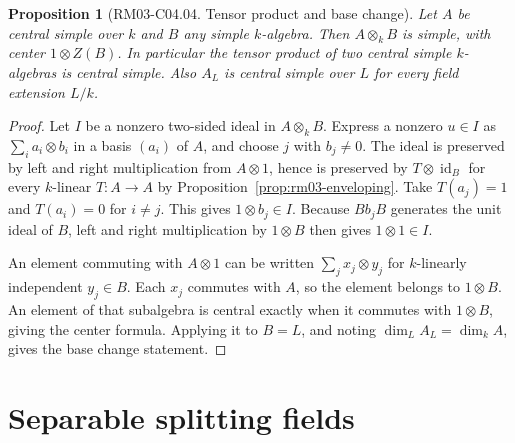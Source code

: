\documentclass[11pt,oneside,openany]{book}
\newtheorem{proposition}[theorem]{Proposition}
\theoremstyle{definition}
\theoremstyle{remark}
\begin{document}
\begin{proposition}[RM03-C04.04. Tensor product and base change]
\label{prop:rm03-csa-tensor}
Let \(A\) be central simple over \(k\) and \(B\) any simple
\(k\)-algebra. Then \(A\otimes_k B\) is simple, with center
\(1\otimes Z(B)\). In particular the tensor product of two central
simple \(k\)-algebras is central simple. Also \(A_L\) is central
simple over \(L\) for every field extension \(L/k\).
\end{proposition}
\begin{proof}
Let \(I\) be a nonzero two-sided ideal in \(A\otimes_k B\). Express
a nonzero \(u\in I\) as \(\sum_i a_i\otimes b_i\) in a basis
\((a_i)\) of \(A\), and choose \(j\) with \(b_j\ne 0\).
The ideal is preserved by left and right multiplication from
\(A\otimes 1\), hence is preserved by \(T\otimes\operatorname{id}_B\)
for every \(k\)-linear \(T:A\to A\) by
Proposition~\ref{prop:rm03-enveloping}. Take \(T(a_j)=1\) and
\(T(a_i)=0\) for \(i\ne j\). This gives \(1\otimes b_j\in I\).
Because \(Bb_jB\) generates the unit ideal of \(B\), left and
right multiplication by \(1\otimes B\) then gives \(1\otimes 1\in I\).

An element commuting with \(A\otimes 1\) can be written
\(\sum_j x_j\otimes y_j\) for \(k\)-linearly independent
\(y_j\in B\). Each \(x_j\) commutes with \(A\), so the element
belongs to \(1\otimes B\). An element of that subalgebra is central
exactly when it commutes with \(1\otimes B\), giving the center formula.
Applying it to \(B=L\), and noting
\(\dim_L A_L=\dim_k A\), gives the base change statement.
\end{proof}

\section{Separable splitting fields}
\end{document}
